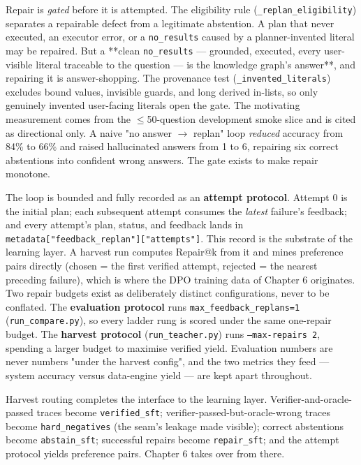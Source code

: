 \documentclass[10pt]{article} %
\begin{document}
Repair is \emph{gated} before it is attempted. The eligibility rule (\texttt{\_replan\_eligibility}) separates a repairable defect from a legitimate abstention. A plan that never executed, an executor error, or a \texttt{no\_results} caused by a planner-invented literal may be repaired. But a **clean \texttt{no\_results} --- grounded, executed, every user-visible literal traceable to the question --- is the knowledge graph's answer**, and repairing it is answer-shopping. The provenance test (\texttt{\_invented\_literals}) excludes bound values, invisible guards, and long derived in-lists, so only genuinely invented user-facing literals open the gate. The motivating measurement comes from the $\leq$50-question development smoke slice and is cited as directional only. A naive "no answer $\rightarrow$ replan" loop \emph{reduced} accuracy from 84\% to 66\% and raised hallucinated answers from 1 to 6, repairing six correct abstentions into confident wrong answers. The gate exists to make repair monotone.

The loop is bounded and fully recorded as an \textbf{attempt protocol}. Attempt 0 is the initial plan; each subsequent attempt consumes the \emph{latest} failure's feedback; and every attempt's plan, status, and feedback lands in \texttt{metadata["feedback\_replan"]["attempts"]}. This record is the substrate of the learning layer. A harvest run computes Repair@k from it and mines preference pairs directly (chosen = the first verified attempt, rejected = the nearest preceding failure), which is where the DPO training data of Chapter 6 originates. Two repair budgets exist as deliberately distinct configurations, never to be conflated. The \textbf{evaluation protocol} runs \texttt{max\_feedback\_replans=1} (\texttt{run\_compare.py}), so every ladder rung is scored under the same one-repair budget. The \textbf{harvest protocol} (\texttt{run\_teacher.py}) runs \texttt{--max-repairs 2}, spending a larger budget to maximise verified yield. Evaluation numbers are never numbers "under the harvest config", and the two metrics they feed --- system accuracy versus data-engine yield --- are kept apart throughout.

Harvest routing completes the interface to the learning layer. Verifier-and-oracle-passed traces become \texttt{verified\_sft}; verifier-passed-but-oracle-wrong traces become \texttt{hard\_negatives} (the seam's leakage made visible); correct abstentions become \texttt{abstain\_sft}; successful repairs become \texttt{repair\_sft}; and the attempt protocol yields preference pairs. Chapter 6 takes over from there.
\end{document}
